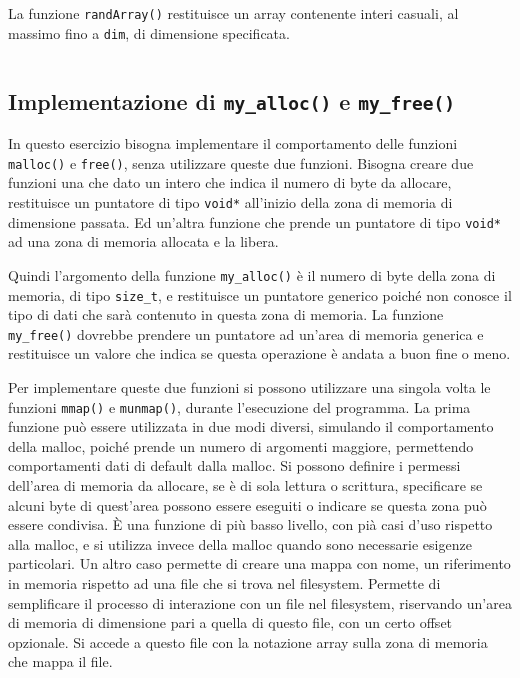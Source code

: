 \documentclass{article}
\numberwithin{equation}{subsection}
\begin{document}
La funzione \verb|randArray()| restituisce un array contenente interi casuali, al massimo fino a \verb|dim|, di dimensione specificata. 
\inputminted[firstline=21, lastline=27]{c}{./"Esercitazione del 19-11-24"/domanda3.c}


\subsection{Implementazione di \texttt{my\_alloc()} e \texttt{my\_free()}}

In questo esercizio bisogna implementare il comportamento delle funzioni \verb|malloc()| e \verb|free()|, 
senza utilizzare queste due funzioni. Bisogna creare due funzioni una che dato un intero che indica il numero di byte 
da allocare, restituisce un puntatore di tipo \verb|void*| all'inizio della zona di memoria di dimensione passata. Ed un'altra funzione 
che prende un puntatore di tipo \verb|void*| ad una zona di memoria allocata e la libera. 

Quindi l'argomento della funzione \verb|my_alloc()| è il numero di byte della zona di memoria, di tipo \verb|size_t|, e 
restituisce un puntatore generico poiché non conosce il tipo di dati che sarà contenuto in questa 
zona di memoria. La funzione \verb|my_free()| dovrebbe prendere un puntatore ad un'area di memoria 
generica e restituisce un valore che indica se questa operazione è andata a buon fine o meno. 

Per implementare queste due funzioni si possono utilizzare una singola volta le funzioni \verb|mmap()| 
e \verb|munmap()|, durante l'esecuzione del programma. 
La prima funzione può essere utilizzata in due modi diversi, simulando il comportamento della malloc, 
poiché prende un numero di argomenti maggiore, permettendo comportamenti dati di default 
dalla malloc. Si possono definire i permessi dell'area di memoria da allocare, se è di sola 
lettura o scrittura, specificare se alcuni byte di quest'area possono essere eseguiti o indicare 
se questa zona può essere condivisa. \`{E} una funzione di più basso livello, con pià casi 
d'uso rispetto alla malloc, e si utilizza invece della malloc quando sono necessarie esigenze 
particolari. Un altro caso permette di creare una mappa con nome, un riferimento in memoria rispetto 
ad una file che si trova nel filesystem. Permette di semplificare il processo di interazione con 
un file nel filesystem, riservando un'area di memoria di dimensione pari a quella di questo file, con un certo offset opzionale. Si accede a questo file con la notazione array sulla zona di memoria che mappa il file. 
\end{document}
